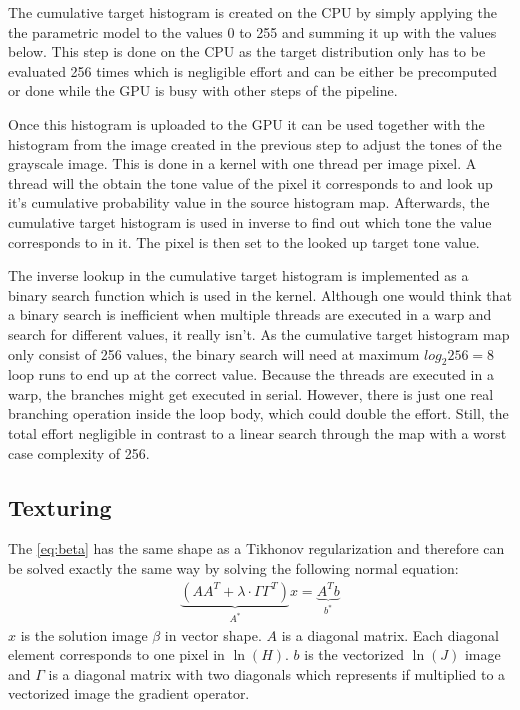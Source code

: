 The cumulative target histogram is created on the CPU by simply applying
the the parametric model to the values 0 to 255 and summing it up with
the values below.
This step is done on the CPU as the target distribution only has to
be evaluated 256 times which is negligible effort and can be either be
precomputed or done while the GPU is busy with other steps of the pipeline.

Once this histogram is uploaded to the GPU it can be used together with
the histogram from the image created in the previous step to adjust the
tones of the grayscale image. This is done in a kernel with one thread
per image pixel. A thread will the obtain the tone value of the pixel
it corresponds to and look up it's cumulative probability value in
the source histogram map.
Afterwards, the cumulative target histogram is used in inverse to find
out which tone the value corresponds to in it. The pixel is then set to
the looked up target tone value.

The inverse lookup in the cumulative target histogram is implemented
as a binary search function which is used in the kernel. Although
one would think that a binary search is inefficient when multiple threads
are executed in a warp and search for different values, it really isn't.
As the cumulative target histogram map only consist of 256 values,
the binary search will need at maximum $log_2 256=8$ loop runs to end
up at the correct value. Because the threads are executed in a warp,
the branches might get executed in serial. However, there is just one 
real branching operation inside the loop body, which could double the
effort. Still, the total effort negligible in contrast to a linear search
through the map with a worst case complexity of 256.

\subsection{Texturing}
The \autoref{eq:beta} has the same shape as a Tikhonov regularization and
therefore can be solved exactly the same way by solving the following normal
equation:
\begin{align}
  \underbrace{(A A^T + \lambda \cdot \Gamma \Gamma^T)}_{A^*} x = \underbrace{A^T
  b}_{b^*}
  \label{eq:tikhonov}
\end{align}
$x$ is the solution image $\beta$ in vector shape. $A$ is a diagonal matrix.
Each diagonal element corresponds to one pixel in $\ln(H)$. $b$ is the
vectorized $\ln(J)$ image and $\Gamma$ is a diagonal matrix with two diagonals
which represents if multiplied to a vectorized image the gradient operator.

